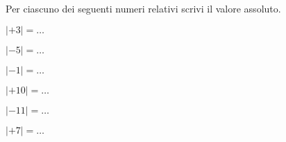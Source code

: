 \vspace{-1em}

\begin{esercizio}
 \label{ese:2.4}
Per ciascuno dei seguenti numeri relativi scrivi il valore assoluto.
\begin{htmulticols}{3}
\begin{enumeratees}
 \item \(|+3|=\ldots\)
 \item \(|-5|=\ldots\)
 \item \(|-1|=\ldots\)
 \item \(|+10|=\ldots\)
 \item \(|-11|=\ldots\)
 \item \(|+7|=\ldots\)
\end{enumeratees}
\end{htmulticols}
\end{esercizio}

